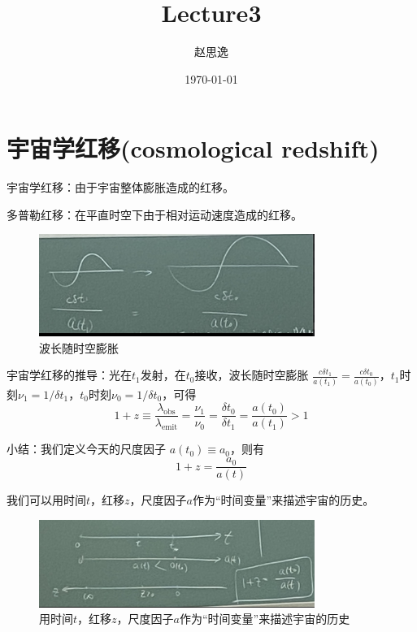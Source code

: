 \documentclass[12pt]{ctexart}
\title{Lecture3}
\author{赵思逸}
\date{\today}
\begin{document}
\maketitle


\section{宇宙学红移(cosmological redshift)}

宇宙学红移：由于宇宙整体膨胀造成的红移。
\par 多普勒红移：在平直时空下由于相对运动速度造成的红移。

\begin{figure}[!hbtp]
    \centering
    \includegraphics[width=0.8\textwidth]{figures/lambda.jpg}
    \caption{波长随时空膨胀}
\end{figure}
宇宙学红移的推导：光在$t_1$发射，在$t_0$接收，波长随时空膨胀
$\frac{c\delta t_1}{a(t_1)} = \frac{c\delta t_0}{a(t_0)}$，$t_1$时刻$\nu_1 = 1/\delta t_1$，$t_0$时刻$\nu_0 = 1/\delta t_0$，可得 
\begin{equation}
    1+z\equiv \frac{\lambda_\text{obs}}{\lambda_\text{emit}} = \frac{\nu_1}{\nu_0} = \frac{\delta t_0}{\delta t_1}= \frac{a(t_0)}{a(t_1)} >1
\end{equation}

小结：我们定义今天的尺度因子 $a(t_0)\equiv a_0$，则有 
\begin{equation}
    1+z=\frac{a_0}{a(t)}
\end{equation}

我们可以用时间$t$，红移$z$，尺度因子$a$作为“时间变量”来描述宇宙的历史。
\begin{figure}[!hbtp]
    \centering
    \includegraphics[width=0.8\textwidth]{figures/time.jpg}
    \caption{用时间$t$，红移$z$，尺度因子$a$作为“时间变量”来描述宇宙的历史}
\end{figure}
\end{document}
